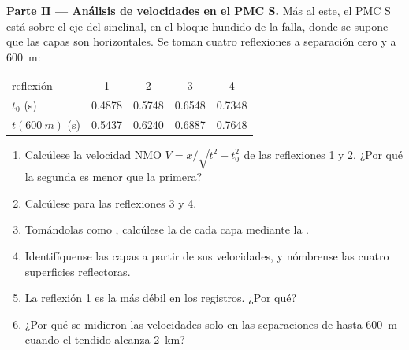 \begin{problem}
\noindent\textbf{Parte II --- Análisis de velocidades en el PMC S.} Más al este, el PMC S
está sobre el eje del sinclinal, en el bloque hundido de la falla, donde
se supone que las capas son horizontales. Se toman cuatro reflexiones a separación cero y a
\qty{600}{m}:
\begin{center}
\small
\begin{tabular}{lcccc}
\hline
reflexión & 1 & 2 & 3 & 4 \\
$t_0$ (\unit{s}) & 0.4878 & 0.5748 & 0.6548 & 0.7348 \\
$t(\qty{600}{m})$ (\unit{s}) & 0.5437 & 0.6240 & 0.6887 & 0.7648 \\
\hline
\end{tabular}
\end{center}
\begin{enumerate}[resume]
  \item Calcúlese la velocidad NMO $V = x/\sqrt{t^2 - t_0^2}$ de las reflexiones 1
        y 2. ¿Por qué la segunda es menor que la primera?
  \item Calcúlese para las reflexiones 3 y 4.
  \item Tomándolas como , calcúlese la  de cada
        capa mediante la .
  \item Identifíquense las capas a partir de sus velocidades, y nómbrense las cuatro
        superficies reflectoras.
  \item La reflexión 1 es la más débil en los registros. ¿Por qué?
  \item ¿Por qué se midieron las velocidades solo en las separaciones de hasta \qty{600}{m}
        cuando el tendido alcanza \qty{2}{km}?
\end{enumerate}


\end{problem}
